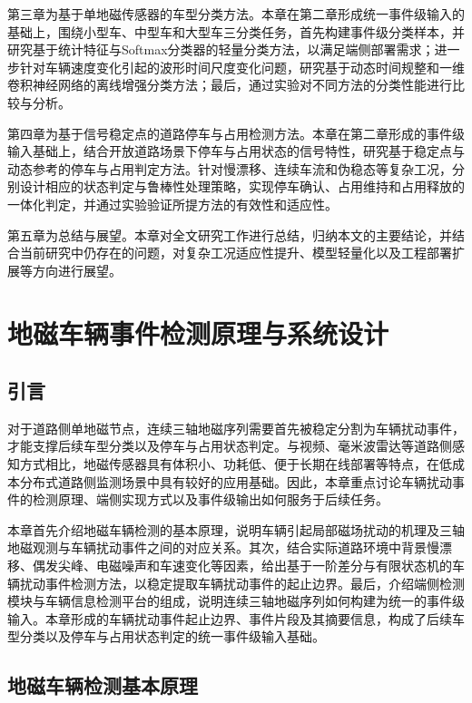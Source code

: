 \documentclass{xdupgthesis}
\begin{document}
第三章为基于单地磁传感器的车型分类方法。本章在第二章形成统一事件级输入的基础上，围绕小型车、中型车和大型车三分类任务，首先构建事件级分类样本，并研究基于统计特征与Softmax分类器的轻量分类方法，以满足端侧部署需求；进一步针对车辆速度变化引起的波形时间尺度变化问题，研究基于动态时间规整和一维卷积神经网络的离线增强分类方法；最后，通过实验对不同方法的分类性能进行比较与分析。

第四章为基于信号稳定点的道路停车与占用检测方法。本章在第二章形成的事件级输入基础上，结合开放道路场景下停车与占用状态的信号特性，研究基于稳定点与动态参考的停车与占用判定方法。针对慢漂移、连续车流和伪稳态等复杂工况，分别设计相应的状态判定与鲁棒性处理策略，实现停车确认、占用维持和占用释放的一体化判定，并通过实验验证所提方法的有效性和适应性。

第五章为总结与展望。本章对全文研究工作进行总结，归纳本文的主要结论，并结合当前研究中仍存在的问题，对复杂工况适应性提升、模型轻量化以及工程部署扩展等方向进行展望。








\chapter{地磁车辆事件检测原理与系统设计}
\label{ch:ch2_event_detect}

\section{引言}
\label{sec:ch2_intro}

对于道路侧单地磁节点，连续三轴地磁序列需要首先被稳定分割为车辆扰动事件，才能支撑后续车型分类以及停车与占用状态判定。与视频、毫米波雷达等道路侧感知方式相比，地磁传感器具有体积小、功耗低、便于长期在线部署等特点，在低成本分布式道路侧监测场景中具有较好的应用基础\cite{wang2018roadside}。因此，本章重点讨论车辆扰动事件的检测原理、端侧实现方式以及事件级输出如何服务于后续任务。

本章首先介绍地磁车辆检测的基本原理，说明车辆引起局部磁场扰动的机理及三轴地磁观测与车辆扰动事件之间的对应关系。其次，结合实际道路环境中背景慢漂移、偶发尖峰、电磁噪声和车速变化等因素，给出基于一阶差分与有限状态机的车辆扰动事件检测方法，以稳定提取车辆扰动事件的起止边界。最后，介绍端侧检测模块与车辆信息检测平台的组成，说明连续三轴地磁序列如何构建为统一的事件级输入。本章形成的车辆扰动事件起止边界、事件片段及其摘要信息，构成了后续车型分类以及停车与占用状态判定的统一事件级输入基础。

\section{地磁车辆检测基本原理}
\label{sec:ch2_principle}
\end{document}
